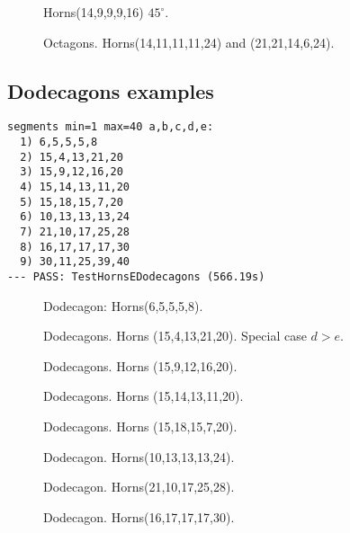 \documentclass[11pt]{article}
\begin{document}
\begin{figure}[H]
\centering
{}
\caption{Horns(14,9,9,9,16) $45^\circ$.}
\end{figure}

\begin{figure}[H]
\centering
{}
\caption{Octagons. Horns(14,11,11,11,24) and (21,21,14,6,24).}
\end{figure}

\subsection{Dodecagons examples}

\begin{lstlisting}
segments min=1 max=40 a,b,c,d,e:
  1) 6,5,5,5,8
  2) 15,4,13,21,20
  3) 15,9,12,16,20
  4) 15,14,13,11,20
  5) 15,18,15,7,20
  6) 10,13,13,13,24
  7) 21,10,17,25,28
  8) 16,17,17,17,30
  9) 30,11,25,39,40
--- PASS: TestHornsEDodecagons (566.19s)
\end{lstlisting}

\begin{figure}[H]
\centering
{}
\caption{Dodecagon: Horns(6,5,5,5,8).}
\end{figure}

\begin{figure}[H]
\centering
{}
\caption{ Dodecagons. Horns (15,4,13,21,20). Special case $d > e$.}
\end{figure}

\begin{figure}[H]
\centering
{}
\caption{ Dodecagons. Horns (15,9,12,16,20).
}
\end{figure}

\begin{figure}[H]
\centering
{}
\caption{ Dodecagons. Horns (15,14,13,11,20).
}
\end{figure}

\begin{figure}[H]
\centering
{}
\caption{ Dodecagons. Horns (15,18,15,7,20).
}
\end{figure}

\begin{figure}[H]
\centering
{}
\caption{Dodecagon. Horns(10,13,13,13,24).}
\end{figure}

\begin{figure}[H]
\centering
{}
\caption{Dodecagon. Horns(21,10,17,25,28).}
\end{figure}

\begin{figure}[H]
\centering
{}
\caption{Dodecagon. Horns(16,17,17,17,30).}
\end{figure}
\end{document}
